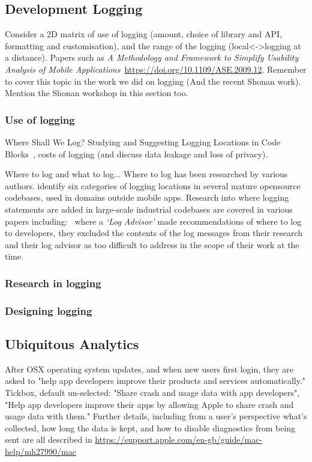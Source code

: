 \subsection{Development Logging}
Consider a 2D matrix of use of logging (amount, choice of library and API, formatting and customisation), and the range of the logging (local<->logging at a distance). Papers such as \emph{A Methodology and Framework to Simplify Usability Analysis of Mobile Applications}~\url{https://doi.org/10.1109/ASE.2009.12}. Remember to cover this topic in the work we did on logging (And the recent Shonan work). Mention the Shonan workshop in this section too.

\subsubsection{Use of logging}

Where Shall We Log? Studying and Suggesting Logging Locations in Code Blocks~\cite{li2020_where_shall_we_log}, costs of logging (and discuss data leakage and loss of privacy).


Where to log and what to log... Where to log has been researched by various authors. \cite{li2020_where_shall_we_log} identify six categories of logging locations in several mature opensource codebases, used in domains outside mobile apps. Research into where logging statements are added in large-scale industrial codebases are covered in various papers including:~\cite{zhu2015_learning_to_log} where a \emph{`Log Advisor'} made recommendations of where to log to developers, they excluded the contents of the log messages from their research and their log advisor as too difficult to address in the scope of their work at the time.



\subsubsection{Research in logging}

\subsubsection{Designing logging}

\subsection{Ubiquitous Analytics}
After OSX operating system updates, and when new users first login, they are asked to "help app developers improve their products and services automatically." Tickbox, default un-selected: "Share crash and usage data with app developers", "Help app developers improve their apps by allowing Apple to share crash and usage data with them." Further details, including from a user's perspective what's collected, how long the data is kept, and how to disable diagnostics from being sent are all described in \url{https://support.apple.com/en-gb/guide/mac-help/mh27990/mac}

